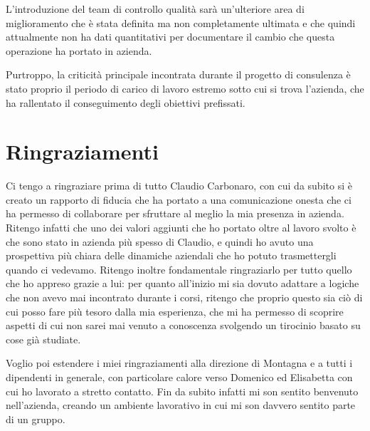 \begin{multicols}{2}
	L'introduzione del team di controllo qualità sarà un'ulteriore area di miglioramento che è stata definita ma non completamente ultimata e che quindi attualmente non ha dati quantitativi per documentare il cambio che questa operazione ha portato in azienda. 

    Purtroppo, la criticità principale incontrata durante il progetto di consulenza è stato proprio il periodo di carico di lavoro estremo sotto cui si trova l'azienda, che ha rallentato il conseguimento degli obiettivi prefissati.

\section{Ringraziamenti}
	Ci tengo a ringraziare prima di tutto Claudio Carbonaro, con cui da subito si è creato un rapporto di fiducia che ha portato a una comunicazione onesta che ci ha permesso di collaborare per sfruttare al meglio la mia presenza in azienda. Ritengo infatti che uno dei valori aggiunti che ho portato oltre al lavoro svolto è che sono stato in azienda più spesso di Claudio, e quindi ho avuto una prospettiva più chiara delle dinamiche aziendali che ho potuto trasmettergli quando ci vedevamo. Ritengo inoltre fondamentale ringraziarlo per tutto quello che ho appreso grazie a lui: per quanto all'inizio mi sia dovuto adattare a logiche che non avevo mai incontrato durante i corsi, ritengo che proprio questo sia ciò di cui posso fare più tesoro dalla mia esperienza, che mi ha permesso di scoprire aspetti di cui non sarei mai venuto a conoscenza svolgendo un tirocinio basato su cose già studiate.

	Voglio poi estendere i miei ringraziamenti alla direzione di Montagna e a tutti i dipendenti in generale, con particolare calore verso Domenico ed Elisabetta con cui ho lavorato a stretto contatto. Fin da subito infatti mi son sentito benvenuto nell'azienda, creando un ambiente lavorativo in cui mi son davvero sentito parte di un gruppo.
\end{multicols}
